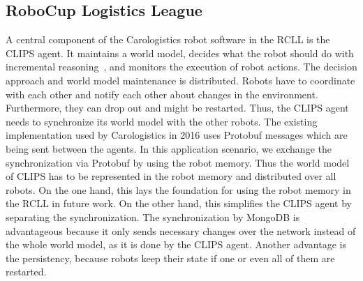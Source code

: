 \subsection{RoboCup Logistics League}
\label{sec:app-rcll}
A central component of
the Carologistics robot software in the RCLL is the CLIPS agent. It
maintains a world model, decides what the robot should do with
incremental reasoning~\cite{CLIPS-Agent}, and monitors the execution
of robot actions. The decision approach and world model maintenance is
distributed. Robots have to coordinate with each other and notify each
other about changes in the environment. Furthermore, they can drop out
and might be restarted. Thus, the CLIPS agent needs to synchronize its
world model with the other robots. The existing implementation used by
Carologistics in 2016 uses Protobuf messages which are being sent
between the agents. In this application scenario, we exchange the
synchronization via Protobuf by using the robot memory. Thus the world
model of CLIPS has to be represented in the robot memory and
distributed over all robots. On the one hand, this lays the foundation
for using the robot memory in the RCLL in future work. On the other
hand, this simplifies the CLIPS agent by separating the
synchronization. The synchronization by MongoDB is advantageous
because it only sends necessary changes over the network instead of
the whole world model, as it is done by the CLIPS agent. Another
advantage is the persistency, because robots keep their state if one
or even all of them are restarted.

